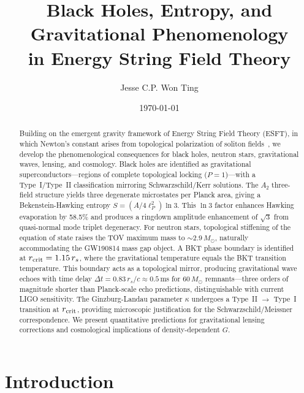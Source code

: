 ﻿\documentclass[twocolumn,preprintnumbers,amsmath,amssymb,prd]{revtex4-2}
\begin{document}
\title{Black Holes, Entropy, and Gravitational Phenomenology\\in Energy String Field Theory}

\author{Jesse C.P. Won Ting}

\date{\today}

\begin{abstract}
Building on the emergent gravity framework of Energy String Field Theory (ESFT), in which Newton's constant arises from topological polarization of soliton fields~\cite{Paper6}, we develop the phenomenological consequences for black holes, neutron stars, gravitational waves, lensing, and cosmology. Black holes are identified as gravitational superconductors---regions of complete topological locking ($P = 1$)---with a Type~I/Type~II classification mirroring Schwarzschild/Kerr solutions. The $A_2$ three-field structure yields three degenerate microstates per Planck area, giving a Bekenstein-Hawking entropy $S = (A/4\ell_P^2)\ln 3$. This $\ln 3$ factor enhances Hawking evaporation by 58.5\% and produces a ringdown amplitude enhancement of $\sqrt{3}$ from quasi-normal mode triplet degeneracy. For neutron stars, topological stiffening of the equation of state raises the TOV maximum mass to $\sim 2.9\,M_\odot$, naturally accommodating the GW190814 mass gap object. A BKT phase boundary is identified at $r_{\rm crit} = 1.15\,r_s$, where the gravitational temperature equals the BKT transition temperature. This boundary acts as a topological mirror, producing gravitational wave echoes with time delay $\Delta t = 0.83\,r_s/c \approx 0.5\,$ms for $60\,M_\odot$ remnants---three orders of magnitude shorter than Planck-scale echo predictions, distinguishable with current LIGO sensitivity. The Ginzburg-Landau parameter $\kappa$ undergoes a Type~II $\to$ Type~I transition at $r_{\rm crit}$, providing microscopic justification for the Schwarzschild/Meissner correspondence. We present quantitative predictions for gravitational lensing corrections and cosmological implications of density-dependent $G$.
\end{abstract}

\maketitle

\section{Introduction}
\end{document}

